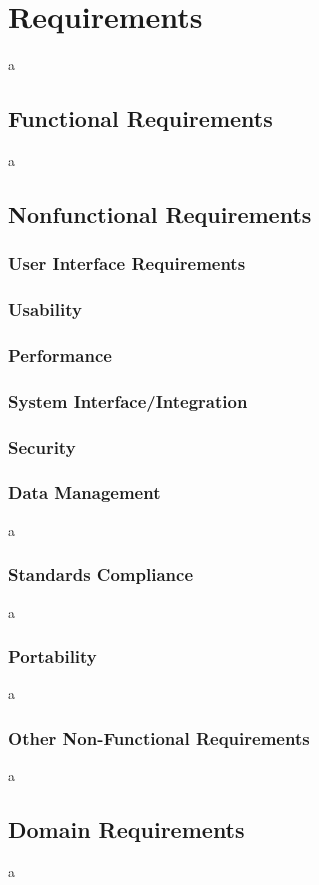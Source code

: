 \section{Requirements}
a

\subsection{Functional Requirements}
a

\subsection{Non\-functional Requirements}

\subsubsection{User Interface Requirements}

\subsubsection{Usability}

\subsubsection{Performance}

\subsubsection{System Interface/Integration}

\subsubsection{Security}

\subsubsection{Data Management}
a

\subsubsection{Standards Compliance}
a

\subsubsection{Portability}
a

\subsubsection{Other Non-Functional Requirements}
a

\subsection{Domain Requirements}
a